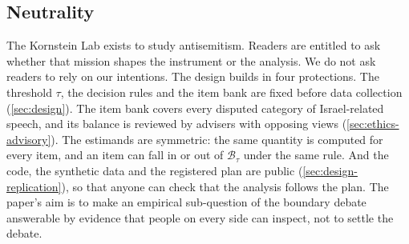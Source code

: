 \subsection{Neutrality}\label{sec:ethics-neutrality}

The Kornstein Lab exists to study antisemitism. Readers are entitled to ask whether that mission shapes the instrument or the analysis. We do not ask readers to rely on our intentions. The design builds in four protections. The threshold $\tau$, the decision rules and the item bank are fixed before data collection (\cref{sec:design}). The item bank covers every disputed category of Israel-related speech, and its balance is reviewed by advisers with opposing views (\cref{sec:ethics-advisory}). The estimands are symmetric: the same quantity is computed for every item, and an item can fall in or out of $\mathcal{B}_\tau$ under the same rule. And the code, the synthetic data and the registered plan are public (\cref{sec:design-replication}), so that anyone can check that the analysis follows the plan. The paper's aim is to make an empirical sub-question of the boundary debate answerable by evidence that people on every side can inspect, not to settle the debate.
